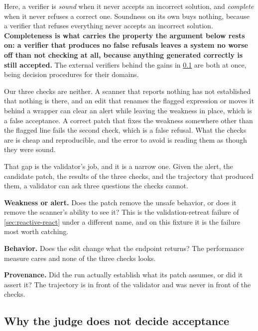 Here, a verifier is \emph{sound} when it never accepts an incorrect solution, and \emph{complete}
when it never refuses a correct one. Soundness on its own buys nothing, because a verifier that
refuses everything never accepts an incorrect solution. \textbf{Completeness is what carries the
property the argument below rests on: a verifier that produces no false refusals leaves a system no
worse off than not checking at all, because anything generated correctly is still accepted.} The
external verifiers behind the gains in \cref{sec:validation-evidence} are both at once, being
decision procedures for their domains.

Our three checks are neither. A scanner that reports nothing has not established that nothing is
there, and an edit that renames the flagged expression or moves it behind a wrapper can clear an
alert while leaving the weakness in place, which is a false acceptance. A correct patch that fixes
the weakness somewhere other than the flagged line fails the second check, which is a false refusal.
What the checks are is cheap and reproducible, and the error to avoid is reading them as though they
were sound.

That gap is the validator's job, and it is a narrow one. Given the alert, the candidate patch, the
results of the three checks, and the trajectory that produced them, a validator can ask three
questions the checks cannot.

\bi

\item \textbf{Weakness or alert.} Does the patch remove the unsafe behavior, or does it remove the
scanner's ability to see it? This is the validation-retreat failure of \cref{sec:reactive-react}
under a different name, and on this fixture it is the failure most worth catching.

\item \textbf{Behavior.} Does the edit change what the endpoint returns? The performance measure
cares and none of the three checks looks.

\item \textbf{Provenance.} Did the run actually establish what its patch assumes, or did it assert
it? The trajectory is in front of the validator and was never in front of the checks.

\ei

\subsection{Why the judge does not decide acceptance}
\label{sec:validation-evidence}

